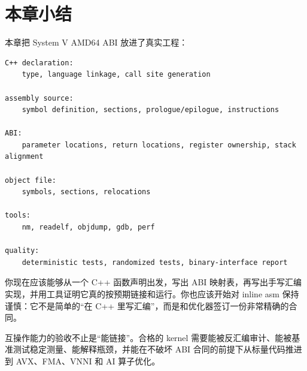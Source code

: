 \section{本章小结}

本章把 System V AMD64 ABI 放进了真实工程：

\begin{lstlisting}
C++ declaration:
    type, language linkage, call site generation

assembly source:
    symbol definition, sections, prologue/epilogue, instructions

ABI:
    parameter locations, return locations, register ownership, stack alignment

object file:
    symbols, sections, relocations

tools:
    nm, readelf, objdump, gdb, perf

quality:
    deterministic tests, randomized tests, binary-interface report
\end{lstlisting}

你现在应该能够从一个 C++ 函数声明出发，写出 ABI 映射表，再写出手写汇编实现，并用工具证明它真的按预期链接和运行。你也应该开始对 inline asm 保持谨慎：它不是简单的“在 C++ 里写汇编”，而是和优化器签订一份非常精确的合同。

互操作能力的验收不止是“能链接”。合格的 kernel 需要能被反汇编审计、能被基准测试稳定测量、能解释瓶颈，并能在不破坏 ABI 合同的前提下从标量代码推进到 AVX、FMA、VNNI 和 AI 算子优化。
